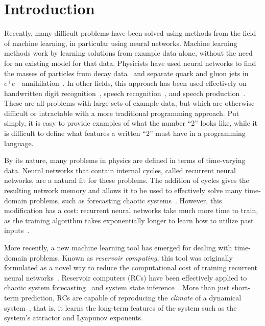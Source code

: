 \chapter{Introduction}\label{ch:introduction}


Recently, many difficult problems have been solved using methods from
the field of machine learning, in particular using neural
networks. Machine learning methods work by learning solutions from
example data alone, without the need for an existing model for that
data.  Physicists have used neural networks to find the masses of
particles from decay data~\cite{lonnblad1992} and separate quark and
gluon jets in $e^+ e^-$ annihilation~\cite{csabai1991}.  In other
fields, this approach has been used effectively on handwritten digit
recognition~\cite{lecun1998,simard2003}, speech
recognition~\cite{hinton2012}, and speech production~\cite{oord2016}.
These are all problems with large sets of example data, but which are
otherwise difficult or intractable with a more traditional programming
approach. Put simply, it is easy to provide examples of what the
number ``\num{2}'' looks like, while it is difficult to define what
features a written ``\num{2}'' must have in a programming language.

By its nature, many problems in physics are defined in terms of
time-varying data. Neural networks that contain internal cycles,
called recurrent neural networks, are a natural fit for these
problems. The addition of cycles gives the resulting network memory
and allows it to be used to effectively solve many time-domain
problems, such as forecasting chaotic
systems~\cite{garcia-pedrero2010}. However, this modification has a
cost: recurrent neural networks take much more time to train, as the
training algorithm takes exponentially longer to learn how to utilize
past inputs~\cite{bengio1994,lukosevicius2009}.

More recently, a new machine learning tool has emerged for dealing
with time-domain problems.  Known as \emph{reservoir computing}, this
tool was originally formulated as a novel way to reduce the
computational cost of training recurrent neural
networks~\cite{lukosevicius2009}. Reservoir computers (RCs) have been
effectively applied to chaotic system
forecasting~\cite{jaeger1978,pathak2017} and system state
inference~\cite{lu2017}. More than just short-term prediction, RCs are
capable of reproducing the \emph{climate} of a dynamical
system~\cite{pathak2017,haluszczynski2019}, that is, it learns the long-term
features of the system such as the system's attractor and Lyapunov
exponents.

